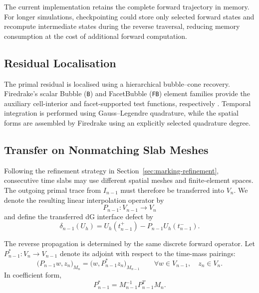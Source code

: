 The current implementation retains the complete forward trajectory in memory. For longer simulations, checkpointing could store only selected forward states and recompute intermediate states during the reverse traversal, reducing memory consumption at the cost of additional forward computation.



\subsection{Residual Localisation}

The primal residual is localised using a hierarchical bubble--cone recovery. Firedrake's scalar Bubble (\texttt{B}) and FacetBubble (\texttt{FB}) element families provide the auxiliary cell-interior and facet-supported test functions, respectively \cite{Firedrake}.
Temporal integration is performed using Gauss--Legendre quadrature, while the spatial forms are assembled by Firedrake using an explicitly selected quadrature degree.



\subsection{Transfer on Nonmatching Slab Meshes}
\label{sec:slab-transfer-adjoint}

Following the refinement strategy in Section~\ref{sec:marking-refinement}, consecutive time slabs may use different spatial meshes and finite-element spaces. The outgoing primal trace from \(I_{n-1}\) must therefore be transferred into \(V_n\). We denote the resulting linear interpolation operator by
\begin{equation}
  P_{n-1}:V_{n-1}\longrightarrow V_n
  \label{eq:forward-slab-transfer}
\end{equation}
and define the transferred dG interface defect by
\begin{equation}
  \delta_{n-1}(U_h)
  =
  U_h(t_{n-1}^{+})
  -
  P_{n-1}U_h(t_{n-1}^{-}).
  \label{eq:transferred-interface-defect-full}
\end{equation}

The reverse propagation is determined by the same discrete forward operator. Let \(P_{n-1}^{\ast}:V_n\rightarrow V_{n-1}\) denote its adjoint with respect to the time-mass pairings:
\begin{equation}
  \bigl(P_{n-1}w,z_n\bigr)_{M_n}
  =
  \bigl(w,P_{n-1}^{\ast}z_n\bigr)_{M_{n-1}}
  \qquad
  \forall w\in V_{n-1},\quad z_n\in V_n.
  \label{eq:mass-adjoint-transfer-definition}
\end{equation}
In coefficient form,
\begin{equation}
  P_{n-1}^{\ast}
  =
  M_{n-1}^{-1}P_{n-1}^{T}M_n.
  \label{eq:mass-adjoint-transfer-matrix}
\end{equation}

